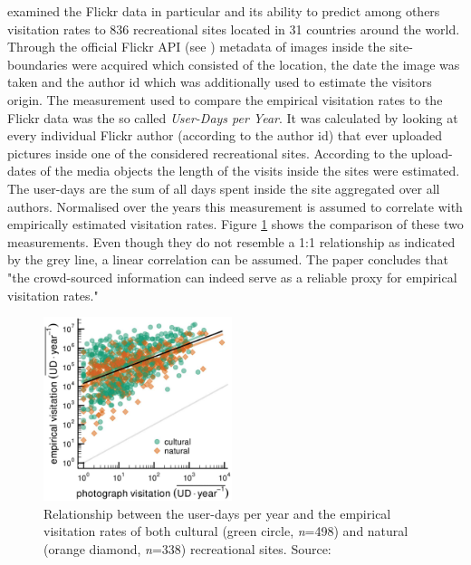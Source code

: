\textcite{Wood2013} examined the Flickr data in particular and its ability to predict among others visitation rates to 836 recreational sites located in 31 countries around the world. Through the official Flickr API (see ) metadata of images inside the site-boundaries were acquired which consisted of the location, the date the image was taken and the author id which was additionally used to estimate the visitors origin. The measurement used to compare the empirical visitation rates to the Flickr data was the so called \textit{User-Days per Year}. It was calculated by looking at every individual Flickr author (according to the author id) that ever uploaded pictures inside one of the considered recreational sites. According to the upload-dates of the media objects the length of the visits inside the sites were estimated. The user-days are the sum of all days spent inside the site aggregated over all authors. Normalised over the years this measurement is assumed to correlate with empirically estimated visitation rates. Figure \ref{fig:wood_user_days} shows the comparison of these two measurements. Even though they do not resemble a 1:1 relationship as indicated by the grey line, a linear correlation can be assumed. The paper concludes that "the crowd-sourced information can indeed serve as a reliable proxy for empirical visitation rates." \parencite[p.1]{Wood2013}

\begin{figure}[!htb]
   \begin{center}
   \includegraphics[width=0.49\textwidth]{img/wood_user_photodays.pdf}
   \end{center}
   \caption{Relationship between the user-days per year and the empirical visitation rates of both cultural (green circle, \textit{n}=498) and natural (orange diamond, \textit{n}=338) recreational sites. Source: \textcite[p.4]{Wood2013}}
   \label{fig:wood_user_days}
\end{figure}

